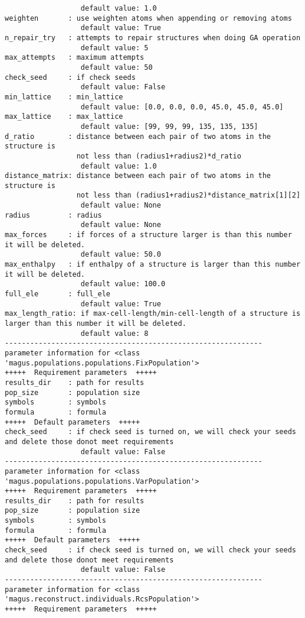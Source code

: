 \documentclass[12pt,oneside]{book}
\begin{document}
\begin{tcolorbox}
\begin{verbatim}
                  default value: 1.0
weighten       : use weighten atoms when appending or removing atoms
                  default value: True
n_repair_try   : attempts to repair structures when doing GA operation
                  default value: 5
max_attempts   : maximum attempts
                  default value: 50
check_seed     : if check seeds
                  default value: False
min_lattice    : min_lattice
                  default value: [0.0, 0.0, 0.0, 45.0, 45.0, 45.0]
max_lattice    : max_lattice
                  default value: [99, 99, 99, 135, 135, 135]
d_ratio        : distance between each pair of two atoms in the structure is
                 not less than (radius1+radius2)*d_ratio
                  default value: 1.0
distance_matrix: distance between each pair of two atoms in the structure is
                 not less than (radius1+radius2)*distance_matrix[1][2]
                  default value: None
radius         : radius
                  default value: None
max_forces     : if forces of a structure larger is than this number it will be deleted.
                  default value: 50.0
max_enthalpy   : if enthalpy of a structure is larger than this number it will be deleted.
                  default value: 100.0
full_ele       : full_ele
                  default value: True
max_length_ratio: if max-cell-length/min-cell-length of a structure is larger than this number it will be deleted.
                  default value: 8
-------------------------------------------------------------
parameter information for <class 'magus.populations.populations.FixPopulation'>
+++++  Requirement parameters  +++++
results_dir    : path for results
pop_size       : population size
symbols        : symbols
formula        : formula
+++++  Default parameters  +++++
check_seed     : if check seed is turned on, we will check your seeds and delete those donot meet requirements
                  default value: False
-------------------------------------------------------------
parameter information for <class 'magus.populations.populations.VarPopulation'>
+++++  Requirement parameters  +++++
results_dir    : path for results
pop_size       : population size
symbols        : symbols
formula        : formula
+++++  Default parameters  +++++
check_seed     : if check seed is turned on, we will check your seeds and delete those donot meet requirements
                  default value: False
-------------------------------------------------------------
parameter information for <class 'magus.reconstruct.individuals.RcsPopulation'>
+++++  Requirement parameters  +++++

\end{verbatim}
\end{tcolorbox}
\end{document}
